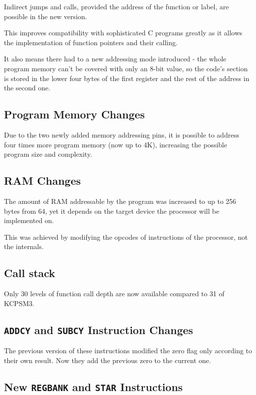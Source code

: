         Indirect jumps and calls, provided the address of the function or label, are possible in the new version.

        This improves compatibility with sophisticated C programs greatly as it allows the implementation of function pointers and their calling.

        It also means there had to a new addressing mode introduced - the whole program memory can't be covered with only an 8-bit value, so the code's section is stored in the lower four bytes of the first register and the rest of the address in the second one.

        \subsection{Program Memory Changes}

        Due to the two newly added memory addressing pins, it is possible to address four times more program memory (now up to 4K), increasing the possible program size and complexity.

        \subsection{RAM Changes}

        The amount of RAM addressable by the program was increased to up to 256 bytes from 64, yet it depends on the target device the processor will be implemented on. 

        This was achieved by modifying the opcodes of instructions of the processor, not the internals.

        \subsection{Call stack}

        Only 30 levels of function call depth are now available compared to 31 of KCPSM3.

        \subsection{\texttt{ADDCY} and \texttt{SUBCY} Instruction Changes}

        The previous version of these instructions modified the zero flag only according to their own result. Now they add the previous zero to the current one.

        \subsection{New \texttt{REGBANK} and \texttt{STAR} Instructions}

